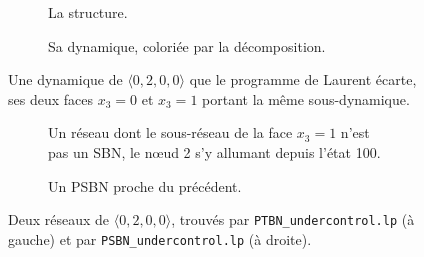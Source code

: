 \documentclass[12pt, a4paper]{article}
\begin{document}
\begin{figure}[H]
    \centering
    \begin{subfigure}{0.48\linewidth}
        \centering
        \caption{La structure.}
    \end{subfigure}
    \hfill
    \begin{subfigure}{0.48\linewidth}
        \centering
        \caption{Sa dynamique, coloriée par la décomposition.}
    \end{subfigure}
    \caption{Une dynamique de $\langle 0,2,0,0\rangle$ que le programme de Laurent écarte, ses deux faces $x_3 = 0$ et $x_3 = 1$ portant la même sous-dynamique.}
    \label{fig:laurent-ecarte}
\end{figure}

\begin{figure}[H]
    \centering
    \begin{subfigure}{0.48\linewidth}
        \centering
        \caption{Un réseau dont le sous-réseau de la face $x_3 = 1$ n'est pas un SBN, le nœud 2 s'y allumant depuis l'état 100.}
    \end{subfigure}
    \hfill
    \begin{subfigure}{0.48\linewidth}
        \centering
        \caption{Un PSBN proche du précédent.}
    \end{subfigure}
    \caption{Deux réseaux de $\langle 0,2,0,0\rangle$, trouvés par \texttt{PTBN\_undercontrol.lp} (à gauche) et par \texttt{PSBN\_undercontrol.lp} (à droite).}
    \label{fig:ptbn-psbn-undercontrol}
\end{figure}
\end{document}
